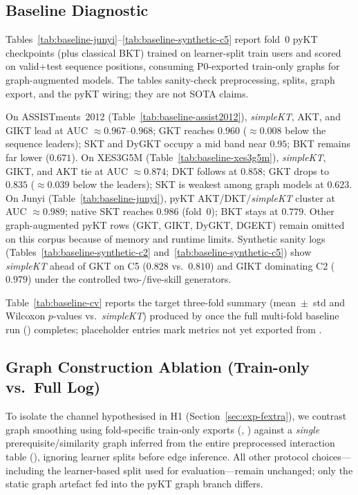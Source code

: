 \documentclass[runningheads]{llncs}
\begin{document}
\subsection{Baseline Diagnostic}
\label{sec:exp-baseline}

Tables~\ref{tab:baseline-junyi}--\ref{tab:baseline-synthetic-c5} report
fold~0 pyKT checkpoints (plus classical BKT) trained on learner-split
train users and scored on valid+test sequence positions, consuming
P0-exported train-only graphs for graph-augmented models. The tables
sanity-check preprocessing, splits, graph export, and the pyKT wiring;
they are not SOTA claims.

On ASSISTments~2012 (Table~\ref{tab:baseline-assist2012}),
\textit{simpleKT}, AKT, and GIKT lead at AUC ${\approx}0.967$--$0.968$;
GKT reaches $0.960$ (${\approx}0.008$ below the sequence leaders);
SKT and DyGKT occupy a mid band near $0.95$; BKT remains far lower
($0.671$). On XES3G5M (Table~\ref{tab:baseline-xes3g5m}),
\textit{simpleKT}, GIKT, and AKT tie at AUC ${\approx}0.874$; DKT
follows at $0.858$; GKT drops to $0.835$ (${\approx}0.039$ below the
leaders); SKT is weakest among graph models at $0.623$. On Junyi
(Table~\ref{tab:baseline-junyi}), pyKT AKT/DKT/\textit{simpleKT} cluster
at AUC ${\approx}0.989$; native SKT reaches $0.986$ (fold~0); BKT stays at
$0.779$. Other graph-augmented pyKT rows (GKT, GIKT, DyGKT, DGEKT) remain
omitted on this corpus because of memory and runtime limits.
Synthetic sanity logs (Tables~\ref{tab:baseline-synthetic-c2}
and~\ref{tab:baseline-synthetic-c5}) show \textit{simpleKT} ahead of GKT
on C5 ($0.828$ vs.\ $0.810$) and GIKT dominating C2 ($0.979$) under the
controlled two-/five-skill generators.


Table~\ref{tab:baseline-cv} reports the target three-fold summary
(mean~$\pm$~std and Wilcoxon $p$-values vs.\ \textit{simpleKT}) produced by
 once the full multi-fold baseline run
() completes; placeholder entries
mark metrics not yet exported from .

\subsection{Graph Construction Ablation (Train-only vs.\ Full Log)}
\label{sec:exp-graph-ablation}
To isolate the channel hypothesised in H1 (Section~\ref{sec:exp-fextra}),
we contrast graph smoothing using fold-specific train-only exports
(, ) against a
\emph{single} prerequisite/similarity graph inferred from the entire
preprocessed interaction table (),
ignoring learner splits before edge inference.
All other protocol choices---including the learner-based split used for
evaluation---remain unchanged; only the static graph artefact fed into the
pyKT graph branch differs.
\end{document}
